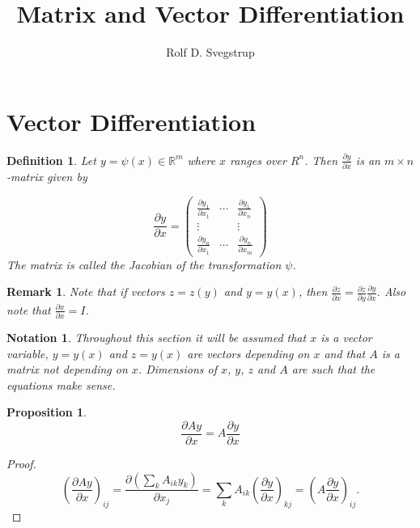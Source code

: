 \documentclass{article}
\title{Matrix and Vector Differentiation}
\author{Rolf D. Svegstrup}
\theoremstyle{plain}
\newtheorem{proposition}[theorem]{Proposition}
\newtheorem{definition}[theorem]{Definition}
\newtheorem{remark}[theorem]{Remark}
\newtheorem{notation}[theorem]{Notation}
\newcommand{\diff}[2]{\frac{\partial {#1}}{\partial {#2}}}
\newcommand{\R}{\mathbb{R}}
\begin{document}
\maketitle

\section{Vector Differentiation}
\begin{definition}
Let $y = \psi(x) \in \R^m$ where $x$ ranges over $R^n$. Then $\diff{y}{x}$ is an $m \times n$-matrix given by

\begin{equation}
\diff{y}{x} = 
\begin{pmatrix} 
\diff{y_1}{x_1} & \cdots & \diff{y_1}{x_n} \\ 
\vdots && \vdots \\ 
\diff{y_n}{x_1} & \cdots & \diff{y_n}{x_m} 
\end{pmatrix}
\end{equation}
The matrix is called the \emph{Jacobian} of the transformation $\psi$.
\end{definition}

\begin{remark}
Note that if vectors $z = z(y)$ and $y = y(x)$, then $\diff{z}{x} = \diff{z}{y} \diff{y}{x}$. Also note that $\diff{x}{x} = I$.
\end{remark}

\begin{notation}
Throughout this section it will be assumed that $x$ is a vector variable, $y = y(x)$ and $z = y(x)$ are vectors depending on $x$ and that $A$ is a matrix not depending on $x$. Dimensions of $x$, $y$, $z$ and $A$ are such that the equations make sense.
\end{notation}

\begin{proposition}
\begin{equation}
\diff{A y}{x} = A \diff{y}{x}
\end{equation}
\end{proposition}
\begin{proof}
\begin{equation*}
\left(\diff{A y}{x}\right)_{ij} = \diff{(\sum_k A_{ik} y_k)}{x_j} = \sum_k A_{ik} \left(\diff{y}{x}\right)_{kj} = \left(A \diff{y}{x}\right)_{ij}.
\end{equation*}
\end{proof}
\end{document}
